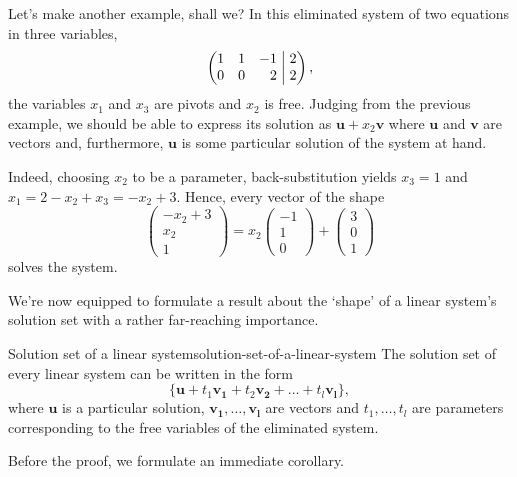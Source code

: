 Let's make another example, shall we? In this eliminated system of two equations
in three variables,
\[
 \left(
  \begin{matrix*}[r]
   1 & 1 & -1\\
   0 & 0 & 2 \\
  \end{matrix*}
  \hspace{1mm}
 \right|
 \left.
  \begin{matrix*}[r]
   2\\
   2
  \end{matrix*}
 \right),
\]
the variables $x_1$ and $x_3$ are pivots and $x_2$ is free. Judging from the
previous example, we should be able to express its solution as $\mathbf{u} + x_2
\mathbf{v}$ where $\mathbf{u}$ and $\mathbf{v}$ are vectors and, furthermore,
$\mathbf{u}$ is some particular solution of the system at hand.

Indeed, choosing $x_2$ to be a parameter, back-substitution yields $x_3 = 1$ and
$x_1 = 2 - x_2 + x_3 = -x_2 + 3$. Hence, every vector of the shape
\[
 \begin{pmatrix}
  -x_2 + 3\\
  x_2\\
  1
 \end{pmatrix} = x_2
 \begin{pmatrix}
  -1\\
  1\\
  0
 \end{pmatrix} + 
 \begin{pmatrix}
  3\\
  0\\
  1
 \end{pmatrix}
\]
solves the system.

We're now equipped to formulate a result about the `shape' of a linear system's
solution set with a rather far-reaching importance.

\begin{theorem}{Solution set of a linear system}{solution-set-of-a-linear-system}
 The solution set of every linear system can be written in the form
 \[
  \{\mathbf{u} + t_1 \mathbf{v_1} + t_2 \mathbf{v_2} + \ldots +
  t_l\mathbf{v_l}\},
 \]
 where $\mathbf{u}$ is a particular solution, $\mathbf{v_1},\ldots,\mathbf{v_l}$
 are vectors and $t_1,\ldots,t_l$ are parameters corresponding to the free
 variables of the eliminated system.
\end{theorem}

Before the proof, we formulate an immediate corollary.

